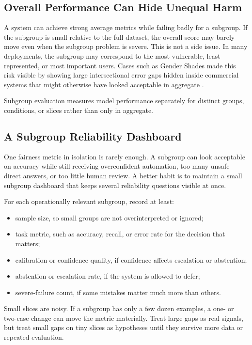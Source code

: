 \subsection{Overall Performance Can Hide Unequal Harm}

A system can achieve strong average metrics while failing badly for a subgroup. If the subgroup is small relative to the full dataset, the overall score may barely move even when the subgroup problem is severe. This is not a side issue. In many deployments, the subgroup may correspond to the most vulnerable, least represented, or most important users. Cases such as Gender Shades made this risk visible by showing large intersectional error gaps hidden inside commercial systems that might otherwise have looked acceptable in aggregate \citep{buolamwini2018}.

\begin{definition}
Subgroup evaluation measures model performance separately for distinct groups, conditions, or slices rather than only in aggregate.
\end{definition}

\subsection{A Subgroup Reliability Dashboard}

One fairness metric in isolation is rarely enough. A subgroup can look acceptable on accuracy while still receiving overconfident automation, too many unsafe direct answers, or too little human review. A better habit is to maintain a small subgroup dashboard that keeps several reliability questions visible at once.

For each operationally relevant subgroup, record at least:
\begin{itemize}[leftmargin=*]
\item sample size, so small groups are not overinterpreted or ignored;
\item task metric, such as accuracy, recall, or error rate for the decision that matters;
\item calibration or confidence quality, if confidence affects escalation or abstention;
\item abstention or escalation rate, if the system is allowed to defer;
\item severe-failure count, if some mistakes matter much more than others.
\end{itemize}

\begin{practicalnote}
Small slices are noisy. If a subgroup has only a few dozen examples, a one- or two-case change can move the metric materially. Treat large gaps as real signals, but treat small gaps on tiny slices as hypotheses until they survive more data or repeated evaluation.
\end{practicalnote}


